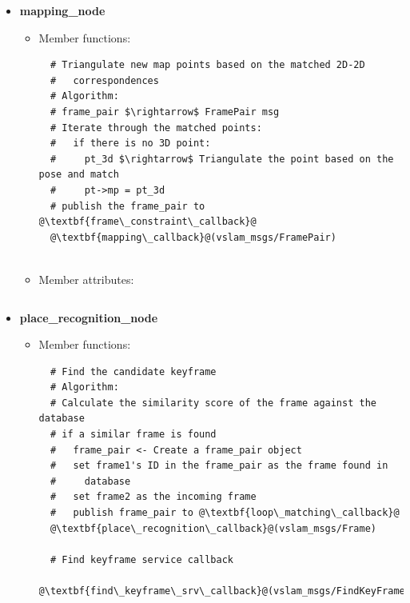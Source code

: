 \begin{itemize}
\begin{itemize}
\begin{lstlisting}
  # Private function
  # Calculate 3D-2D camera pose
  @\textbf{track\_camera\_3d2d}@

  # Private function
  # Calculate 2D-2D camera pose
  @\textbf{track\_camera\_2d2d}@
\end{lstlisting}

    \item Member attributes:
\begin{lstlisting}

\end{lstlisting}
  \end{itemize} 

  \item \textbf{mapping\_node}
  \begin{itemize}
    \item Member functions:
\begin{lstlisting}
  # Triangulate new map points based on the matched 2D-2D 
  #   correspondences
  # Algorithm:
  # frame_pair $\rightarrow$ FramePair msg
  # Iterate through the matched points:
  #   if there is no 3D point:
  #     pt_3d $\rightarrow$ Triangulate the point based on the pose and match
  #     pt->mp = pt_3d
  # publish the frame_pair to @\textbf{frame\_constraint\_callback}@
  @\textbf{mapping\_callback}@(vslam_msgs/FramePair)
  
\end{lstlisting}

    \item Member attributes:
\begin{lstlisting}

\end{lstlisting}
  \end{itemize} 

  \item \textbf{place\_recognition\_node}
  \begin{itemize}
    \item Member functions:
\begin{lstlisting}
  # Find the candidate keyframe
  # Algorithm:
  # Calculate the similarity score of the frame against the database
  # if a similar frame is found
  #   frame_pair <- Create a frame_pair object
  #   set frame1's ID in the frame_pair as the frame found in 
  #     database
  #   set frame2 as the incoming frame
  #   publish frame_pair to @\textbf{loop\_matching\_callback}@
  @\textbf{place\_recognition\_callback}@(vslam_msgs/Frame)
  
  # Find keyframe service callback
  @\textbf{find\_keyframe\_srv\_callback}@(vslam_msgs/FindKeyFrame)


\end{lstlisting}
\end{itemize}
\end{itemize}
